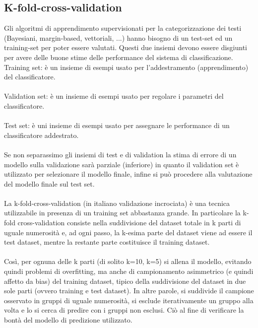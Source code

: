 \documentclass{article}
\theoremstyle{plain}
\theoremstyle{definition}
\begin{document}
\subsection{K-fold-cross-validation}
Gli algoritmi di apprendimento supervisionati per la categorizzazione dei testi (Bayesiani, margin-based, vettoriali, ...) hanno bisogno di un test-set ed un training-set per poter essere valutati. Questi due insiemi devono essere disgiunti per avere delle buone stime delle performance del sistema di classificazione.
\\
Training set: è un insieme di esempi usato per l'addestramento (apprendimento) del classificatore.
\\
\\
Validation set: è un insieme di esempi usato per regolare i parametri del classificatore.
\\
\\
Test set: è uni insieme di esempi usato per assegnare le performance di un classificatore addestrato.
\\
\\
Se non separassimo gli insiemi di test e di validation la stima di errore di un modello sulla validazione sarà parziale (inferiore) in quanto il validation set è utilizzato per selezionare il modello finale, infine si può procedere alla valutazione del modello finale sul test set.
\\
\\
La k-fold-cross-validation (in italiano validazione incrociata) è una tecnica utilizzabile in presenza di un training set abbastanza grande. In particolare la k-fold cross-validation consiste nella suddivisione del dataset totale in k parti di uguale numerosità e, ad ogni passo, la k-esima parte del dataset viene ad essere il test dataset, mentre la restante parte costituisce il training dataset.
\\
\\
Così, per ognuna delle k parti (di solito k=10, k=5) si allena il modello, evitando quindi problemi di overfitting, ma anche di campionamento asimmetrico (e quindi affetto da bias) del training dataset, tipico della suddivisione del dataset in due sole parti (ovvero training e test dataset). In altre parole, si suddivide il campione osservato in gruppi di uguale numerosità, si esclude iterativamente un gruppo alla volta e lo si cerca di predire con i gruppi non esclusi. Ciò al fine di verificare la bontà del modello di predizione utilizzato.
\end{document}
